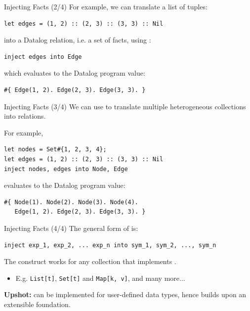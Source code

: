 \begin{frame}[fragile]{Injecting Facts (2/4)}
For example, we can translate a list of tuples:

\begin{lstlisting}[language=flix, xleftmargin=0.8cm]
let edges = (1, 2) :: (2, 3) :: (3, 3) :: Nil
\end{lstlisting}

into a Datalog relation, i.e. a set of facts, using :

\begin{lstlisting}[language=flix, xleftmargin=0.8cm]
inject edges into Edge
\end{lstlisting}

which evaluates to the Datalog program value:

\begin{lstlisting}[language=flix, xleftmargin=0.8cm]
#{ Edge(1, 2). Edge(2, 3). Edge(3, 3). }
\end{lstlisting}
\end{frame}

\begin{frame}[fragile]{Injecting Facts (3/4)}
We can use  to translate multiple heterogeneous collections into
relations.

For example, 

\begin{lstlisting}[language=flix, xleftmargin=0.8cm]
let nodes = Set#{1, 2, 3, 4};
let edges = (1, 2) :: (2, 3) :: (3, 3) :: Nil
inject nodes, edges into Node, Edge
\end{lstlisting}

evaluates to the Datalog program value:

\begin{lstlisting}[language=flix, xleftmargin=0.8cm]
#{ Node(1). Node(2). Node(3). Node(4). 
   Edge(1, 2). Edge(2, 3). Edge(3, 3). }
\end{lstlisting}
\end{frame}

\begin{frame}[fragile]{Injecting Facts (4/4)}
The general form of  is:

\begin{lstlisting}[language=flix, xleftmargin=0.8cm]
inject exp_1, exp_2, ... exp_n into sym_1, sym_2, ..., sym_n
\end{lstlisting}

The  construct works for any collection that implements
. 

\begin{itemize}
    \item E.g. \texttt{List[t]}, \texttt{Set[t]} and \texttt{Map[k, v]}, and many more...
\end{itemize}

\pause

\textbf{Upshot:}  can be implemented for user-defined data
types, hence  builds upon an extensible foundation.
\end{frame}


